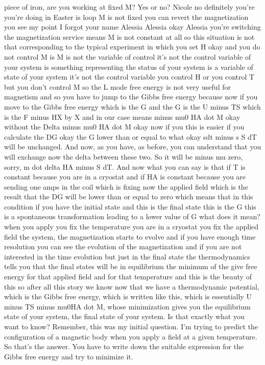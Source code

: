 piece of iron, are you working at fixed M? Yes or no? Nicole no definitely you're you're doing in Easter is loop M is not fixed you can revert the magnetization you see my point I forgot your name Alessia Alessia okay Alessia you're switching the magnetization service means M is not constant at all so this situation is not that corresponding to the typical experiment in which you set H okay and you do not control M is M is not the variable of control it's not the control variable of your system is something representing the status of your system is a variable of state of your system it's not the control variable you control H or you control T but you don't control M so the L mode free energy is not very useful for magnetism and so you have to jump to the Gibbs free energy because now if you move to the Gibbs free energy which is the G and the G is the U minus TS which is the F minus HX by X and in our case means minus mu0 HA dot M okay without the Delta minus mu0 HA dot M okay now if you this is easier if you calculate the DG okay the G lower than or equal to what okay sdt minus s S dT will be unchanged. And now, as you have, as before, you can understand that you will exchange now the delta between these two. So it will be minus mu zero, sorry, m dot delta HA minus S dT. And now what you can say is that if T is constant because you are in a cryostat and if HA is constant because you are sending one amps in the coil which is fixing now the applied field which is the result that the DG will be lower than or equal to zero which means that in this condition if you have the initial state and this is the final state this is the G this is a spontaneous transformation leading to a lower value of G what does it mean? when you apply you fix the temperature you are in a cryostat you fix the applied field the system, the magnetization starts to evolve and if you have enough time resolution you can see the evolution of the magnetization and if you are not interested in the time evolution but just in the final state the thermodynamics tells you that the final states will be in equilibrium the minimum of the give free energy for that applied field and for that temperature and this is the beauty of this so after all this story we know now that we have a thermodynamic potential, which is the Gibbs free energy, which is written like this, which is essentially U minus TS minus mu0HA dot M, whose minimization gives you the equilibrium state of your system, the final state of your system. Is that exactly what you want to know? Remember, this was my initial question. I'm trying to predict the configuration of a magnetic body when you apply a field at a given temperature. So that's the answer. You have to write down the suitable expression for the Gibbs free energy and try to minimize it.
